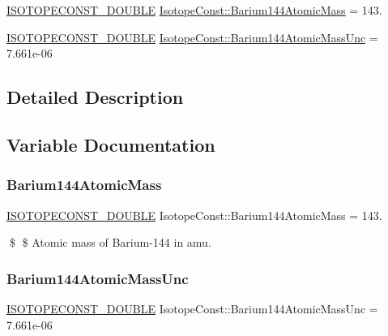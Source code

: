 \begin{DoxyCompactItemize}
\item 
\mbox{\hyperlink{group___isotope_const-_macros_ga8f45a7272ce02c0b4c65c44636ed719a}{I\+S\+O\+T\+O\+P\+E\+C\+O\+N\+S\+T\+\_\+\+D\+O\+U\+B\+LE}} \mbox{\hyperlink{group___isotope_const-_barium-_ba144_ga0ccaf3300587350def6e47bd2cc412d3}{Isotope\+Const\+::\+Barium144\+Atomic\+Mass}} = 143.
\item 
\mbox{\hyperlink{group___isotope_const-_macros_ga8f45a7272ce02c0b4c65c44636ed719a}{I\+S\+O\+T\+O\+P\+E\+C\+O\+N\+S\+T\+\_\+\+D\+O\+U\+B\+LE}} \mbox{\hyperlink{group___isotope_const-_barium-_ba144_ga9ecbcb66f726ff86ec3601872d0f8265}{Isotope\+Const\+::\+Barium144\+Atomic\+Mass\+Unc}} = 7.\+661e-\/06
\end{DoxyCompactItemize}


\subsection{Detailed Description}


\subsection{Variable Documentation}
\mbox{\label{group___isotope_const-_barium-_ba144_ga0ccaf3300587350def6e47bd2cc412d3}} 
\subsubsection{\texorpdfstring{Barium144\+Atomic\+Mass}{Barium144AtomicMass}}
{\footnotesize\ttfamily \mbox{\hyperlink{group___isotope_const-_macros_ga8f45a7272ce02c0b4c65c44636ed719a}{I\+S\+O\+T\+O\+P\+E\+C\+O\+N\+S\+T\+\_\+\+D\+O\+U\+B\+LE}} Isotope\+Const\+::\+Barium144\+Atomic\+Mass = 143.}

\$ \$ Atomic mass of Barium-\/144 in amu. \mbox{\label{group___isotope_const-_barium-_ba144_ga9ecbcb66f726ff86ec3601872d0f8265}} 
\subsubsection{\texorpdfstring{Barium144\+Atomic\+Mass\+Unc}{Barium144AtomicMassUnc}}
{\footnotesize\ttfamily \mbox{\hyperlink{group___isotope_const-_macros_ga8f45a7272ce02c0b4c65c44636ed719a}{I\+S\+O\+T\+O\+P\+E\+C\+O\+N\+S\+T\+\_\+\+D\+O\+U\+B\+LE}} Isotope\+Const\+::\+Barium144\+Atomic\+Mass\+Unc = 7.\+661e-\/06}

